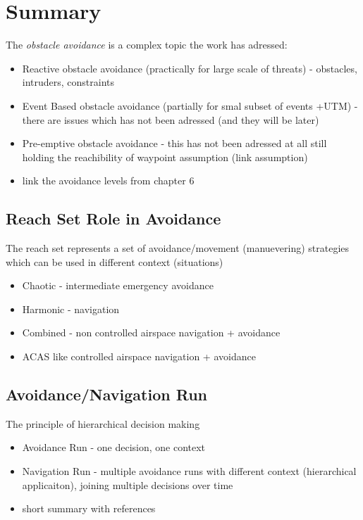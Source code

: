 \section{Summary}\label{s:conclusionSummary}
\noindent The \emph{obstacle avoidance} is a complex topic the work has adressed:
\begin{itemize}
    \item Reactive obstacle avoidance (practically for large scale of threats) - obstacles, intruders, constraints
    
    \item Event Based obstacle avoidance (partially for smal subset of events +UTM) - there are issues which has not been adressed (and they will be later)
    
    \item Pre-emptive obstacle avoidance - this has not been adressed at all still holding the reachibility of waypoint assumption (link assumption) 
    \item link the avoidance levels from chapter 6
\end{itemize}

    
\subsection{Reach Set Role in Avoidance}\label{s:conclusionReachSet}

\noindent The reach set represents a set of avoidance/movement (manuevering) strategies which can be used in different context (situations)
\begin{itemize}
    \item Chaotic - intermediate emergency avoidance
    \item Harmonic - navigation
    \item Combined - non controlled airspace navigation + avoidance
    \item ACAS like  controlled airspace navigation + avoidance
\end{itemize}


\subsection{Avoidance/Navigation Run}\label{s:conclusionAvoidanceNavigationRun}

\noindent The principle of hierarchical decision making
\begin{itemize}
    \item Avoidance Run - one decision, one context
    \item Navigation Run - multiple avoidance runs with different context (hierarchical applicaiton), joining multiple decisions over time
    \item short summary with references
\end{itemize}


